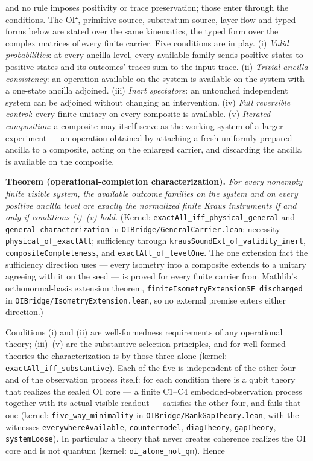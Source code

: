 \documentclass[
]{article}
\begin{document}
and no rule imposes positivity or trace preservation; those enter
through the conditions. The OI⁺, primitive-source, substratum-source,
layer-flow and typed forms below are stated over the same kinematics,
the typed form over the complex matrices of every finite carrier. Five
conditions are in play. (i) \emph{Valid probabilities}: at every ancilla
level, every available family sends positive states to positive states
and its outcomes' traces sum to the input trace. (ii)
\emph{Trivial-ancilla consistency}: an operation available on the system
is available on the system with a one-state ancilla adjoined. (iii)
\emph{Inert spectators}: an untouched independent system can be adjoined
without changing an intervention. (iv) \emph{Full reversible control}:
every finite unitary on every composite is available. (v) \emph{Iterated
composition}: a composite may itself serve as the working system of a
larger experiment --- an operation obtained by attaching a fresh
uniformly prepared ancilla to a composite, acting on the enlarged
carrier, and discarding the ancilla is available on the composite.

\textbf{Theorem (operational-completion characterization).} \emph{For
every nonempty finite visible system, the available outcome families on
the system and on every positive ancilla level are exactly the
normalized finite Kraus instruments if and only if conditions (i)--(v)
hold.} (Kernel: \texttt{exactAll\_iff\_physical\_general} and
\texttt{general\_characterization} in
\texttt{OIBridge/GeneralCarrier.lean}; necessity
\texttt{physical\_of\_exactAll}; sufficiency through
\texttt{krausSoundExt\_of\_validity\_inert},
\texttt{compositeCompleteness}, and \texttt{exactAll\_of\_levelOne}. The
one extension fact the sufficiency direction uses --- every isometry
into a composite extends to a unitary agreeing with it on the seed ---
is proved for every finite carrier from Mathlib's orthonormal-basis
extension theorem, \texttt{finiteIsometryExtensionSF\_discharged} in
\texttt{OIBridge/IsometryExtension.lean}, so no external premise enters
either direction.)

Conditions (i) and (ii) are well-formedness requirements of any
operational theory; (iii)--(v) are the substantive selection principles,
and for well-formed theories the characterization is by those three
alone (kernel: \texttt{exactAll\_iff\_substantive}). Each of the five is
independent of the other four and of the observation process itself: for
each condition there is a qubit theory that realizes the sealed OI core
--- a finite C1--C4 embedded-observation process together with its
actual visible readout --- satisfies the other four, and fails that one
(kernel: \texttt{five\_way\_minimality} in
\texttt{OIBridge/RankGapTheory.lean}, with the witnesses
\texttt{everywhereAvailable}, \texttt{countermodel},
\texttt{diagTheory}, \texttt{gapTheory}, \texttt{systemLoose}). In
particular a theory that never creates coherence realizes the OI core
and is not quantum (kernel: \texttt{oi\_alone\_not\_qm}). Hence
\end{document}
